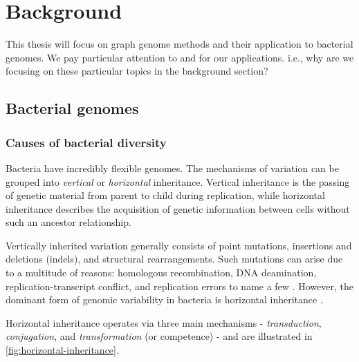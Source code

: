 \chapter{Background}

This thesis will focus on graph genome methods and their application to bacterial genomes. We pay particular attention to \mtb{} and \ont{} for our applications. i.e., why are we focusing on these particular topics in the background section?

\section{Bacterial genomes}
\subsection{Causes of bacterial diversity}
Bacteria have incredibly flexible genomes. The mechanisms of variation can be grouped into \emph{vertical} or \emph{horizontal} inheritance. Vertical inheritance is the passing of genetic material from parent to child during replication, while horizontal inheritance describes the acquisition of genetic information between cells without such an ancestor relationship. 

Vertically inherited variation generally consists of point mutations, insertions and deletions (indels), and structural rearrangements. Such mutations can arise due to a multitude of reasons: homologous recombination, DNA deamination, replication-transcript conflict, and replication errors to name a few \cite{Lan2000}. However, the dominant form of genomic variability in bacteria is horizontal inheritance \cite{McInerney2017}.

Horizontal inheritance operates via three main mechanisms - \textit{transduction}, \textit{conjugation}, and \textit{transformation} (or competence) - and are illustrated in \autoref{fig:horizontal-inheritance}.

